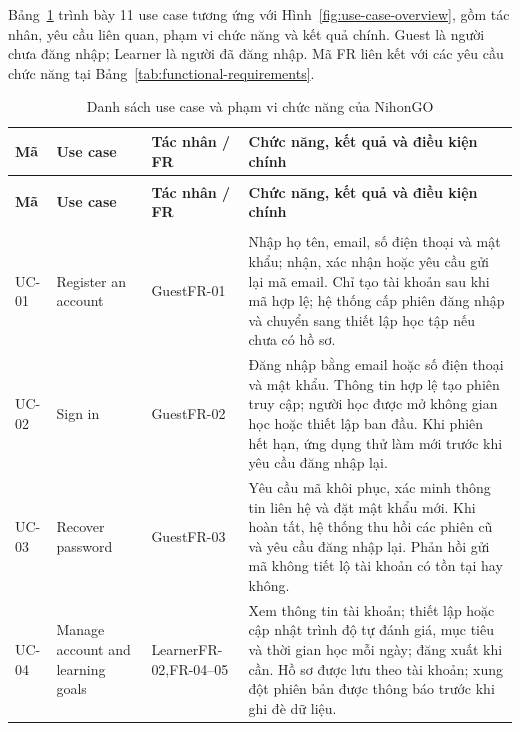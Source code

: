 Bảng~\ref{tab:use-case-list} trình bày 11 use case tương ứng với Hình~\ref{fig:use-case-overview}, gồm tác nhân, yêu cầu liên quan, phạm vi chức năng và kết quả chính. Guest là người chưa đăng nhập; Learner là người đã đăng nhập. Mã FR liên kết với các yêu cầu chức năng tại Bảng~\ref{tab:functional-requirements}.

\begingroup
{}
\fontsize{11}{14}\selectfont
\renewcommand{\arraystretch}{1.1}
\setlength{\LTleft}{0pt}
\setlength{\LTright}{\fill}
\setlength{\LTpre}{4pt}
\setlength{\LTpost}{10pt}
\begin{longtable}{@{}>{\raggedright\arraybackslash}p{1.1cm}>{\raggedright\arraybackslash}p{3.6cm}>{\raggedright\arraybackslash}p{2.1cm}>{\raggedright\arraybackslash}p{7.8cm}@{}}
\caption{Danh sách use case và phạm vi chức năng của NihonGO}
\label{tab:use-case-list}\\
\toprule
\textbf{Mã} & \textbf{Use case} & \textbf{Tác nhân / FR} & \textbf{Chức năng, kết quả và điều kiện chính} \\
\midrule
\endfirsthead
\multicolumn{4}{c}{\tablename~\thetable{} (tiếp theo)}\\
\toprule
\textbf{Mã} & \textbf{Use case} & \textbf{Tác nhân / FR} & \textbf{Chức năng, kết quả và điều kiện chính} \\
\midrule
\endhead
\midrule
\multicolumn{4}{r}{\textit{Tiếp ở trang sau}}\\
\endfoot
\bottomrule
\endlastfoot
UC-01 & Register an account & Guest\newline FR-01 & Nhập họ tên, email, số điện thoại và mật khẩu; nhận, xác nhận hoặc yêu cầu gửi lại mã email. Chỉ tạo tài khoản sau khi mã hợp lệ; hệ thống cấp phiên đăng nhập và chuyển sang thiết lập học tập nếu chưa có hồ sơ. \\
\midrule
UC-02 & Sign in & Guest\newline FR-02 & Đăng nhập bằng email hoặc số điện thoại và mật khẩu. Thông tin hợp lệ tạo phiên truy cập; người học được mở không gian học hoặc thiết lập ban đầu. Khi phiên hết hạn, ứng dụng thử làm mới trước khi yêu cầu đăng nhập lại. \\
\midrule
UC-03 & Recover password & Guest\newline FR-03 & Yêu cầu mã khôi phục, xác minh thông tin liên hệ và đặt mật khẩu mới. Khi hoàn tất, hệ thống thu hồi các phiên cũ và yêu cầu đăng nhập lại. Phản hồi gửi mã không tiết lộ tài khoản có tồn tại hay không. \\
\midrule
UC-04 & Manage account and learning goals & Learner\newline FR-02,\newline FR-04--05 & Xem thông tin tài khoản; thiết lập hoặc cập nhật trình độ tự đánh giá, mục tiêu và thời gian học mỗi ngày; đăng xuất khi cần. Hồ sơ được lưu theo tài khoản; xung đột phiên bản được thông báo trước khi ghi đè dữ liệu. \\

\end{longtable}
